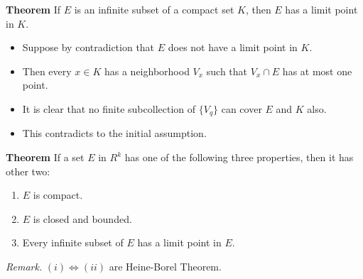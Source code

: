 \documentclass[12pt]{article}
\begin{document}
\vspace{1.5\baselineskip}
\begin{block}{\bf Theorem} If $E$ is an infinite subset of a compact set $K$, then $E$ has a limit point in $K$.
\begin{itemize}
    \item Suppose by contradiction that $E$ does not have a limit point in $K$.
    \item Then every $x\in K$ has a neighborhood $V_x$ such that $V_x\cap E$ has at most one point.
    \item It is clear that no finite subcollection of $\{V_q\}$ can cover $E$ and $K$ also.
    \item This contradicts to the initial assumption.
\end{itemize}
\end{block}

\vspace{1.5\baselineskip}
\begin{block}{\bf Theorem} If a set $E$ in $R^k$ has one of the following three properties, then it has other two:
\begin{enumerate}[label=(\roman*)]
    \item $E$ is compact.
    \item $E$ is closed and bounded.
    \item Every infinite subset of $E$ has a limit point in $E$.\\
\end{enumerate}

{\sl Remark.} $(i)\Longleftrightarrow (ii)$ are Heine-Borel Theorem.
\end{block}
\end{document}
